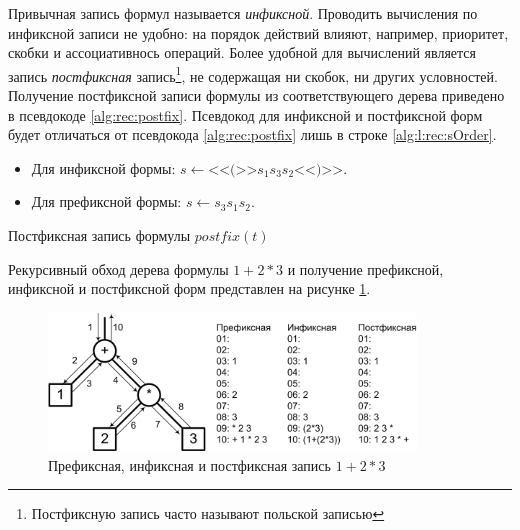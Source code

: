 Привычная запись формул называется \emph{инфиксной}. Проводить вычисления по инфиксной записи не удобно: на порядок действий влияют, например, приоритет, скобки и ассоциативнось операций. Более удобной для вычислений является запись \emph{постфиксная} запись\footnote{Постфиксную запись часто называют польской записью}, не содержащая ни скобок, ни других условностей. Получение постфиксной записи формулы из соответствующего дерева приведено в псевдокоде \ref{alg:rec:postfix}. Псевдокод для инфиксной и постфиксной форм будет отличаться от псевдокода \ref{alg:rec:postfix} лишь в строке \ref{alg:l:rec:sOrder}.
\begin{itemize}
    \item Для инфиксной формы: $s\gets \text{<<(>>}s_1s_3s_2\text{<<)>>}$.
    \item Для префиксной формы: $s\gets s_3s_1s_2$.
\end{itemize}

\begin{algorithm}
    \caption{Постфиксная запись формулы $postfix(t)$}\label{alg:rec:postfix}
    \begin{algorithmic}[1]

            \label{alg:l:rec:sOrder}
        \ENDIF
    \end{algorithmic}
\end{algorithm}

Рекурсивный обход дерева формулы $1+2*3$ и получение префиксной, инфиксной и постфиксной форм представлен на рисунке \ref{fig:rec:XfixForms}.

\begin{figure}
    \centering
    \includegraphics[width=0.87\textwidth]{fig/XfixForms.png}
    \caption{Префиксная, инфиксная и постфиксная запись $1+2*3$}
    \label{fig:rec:XfixForms}
\end{figure}

